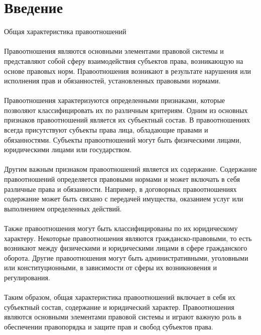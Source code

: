 \documentclass{article}
\begin{document}
\section{Введение}
Общая характеристика правоотношений\\
~\\
Правоотношения являются основными элементами правовой системы и представляют собой сферу взаимодействия субъектов права, возникающую на основе правовых норм. Правоотношения возникают в результате нарушения или исполнения прав и обязанностей, установленных правовыми нормами.\\
~\\
Правоотношения характеризуются определенными признаками, которые позволяют классифицировать их по различным критериям. Одним из основных признаков правоотношений является их субъектный состав. В правоотношениях всегда присутствуют субъекты права  лица, обладающие правами и обязанностями. Субъекты правоотношений могут быть физическими лицами, юридическими лицами или государством.\\
~\\
Другим важным признаком правоотношений является их содержание. Содержание правоотношений определяется правовыми нормами и может включать в себя различные права и обязанности. Например, в договорных правоотношениях содержание может быть связано с передачей имущества, оказанием услуг или выполнением определенных действий.\\
~\\
Также правоотношения могут быть классифицированы по их юридическому характеру. Некоторые правоотношения являются гражданско-правовыми, то есть возникают между физическими и юридическими лицами в сфере гражданского оборота. Другие правоотношения могут быть административными, уголовными или конституционными, в зависимости от сферы их возникновения и регулирования.\\
~\\
Таким образом, общая характеристика правоотношений включает в себя их субъектный состав, содержание и юридический характер. Правоотношения являются основными элементами правовой системы и играют важную роль в обеспечении правопорядка и защите прав и свобод субъектов права.
\end{document}
